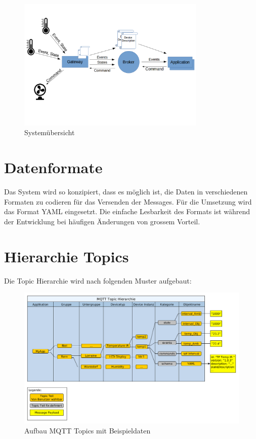 \begin{figure}[H]
	\centering
		\includegraphics[width=0.8\textwidth]{diag/Overview.png}
	\caption{\label{fig:overview}Systemübersicht}
\end{figure}


\section{Datenformate}
Das System wird so konzipiert, dass es möglich ist, die Daten in verschiedenen Formaten zu codieren für das Versenden der Messages. Für die Umsetzung wird das Format YAML eingesetzt. Die einfache Lesbarkeit des Formats ist während der Entwicklung bei häufigen Änderungen von grossem Vorteil.

\newpage

\section{Hierarchie Topics}

Die Topic Hierarchie wird nach folgenden Muster aufgebaut:

\begin{figure}[H]
	\centering
		\includegraphics[width=1.0\textwidth]{diag/topic_hierarchy.png}
	\caption{\label{fig:tempitTopics}Aufbau MQTT Topics mit Beispieldaten}
\end{figure}


